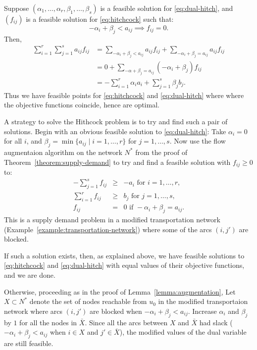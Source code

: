 \documentclass{amsbook}
\theoremstyle{definition}
\theoremstyle{remark}
\begin{document}
Suppose $(\alpha_1,\dotsc,\alpha_r,\beta_1,\dotsc,\beta_s)$ is a feasible solution for \eqref{eq:dual-hitch}, and $(f_{ij})$ is a feasible solution for \eqref{eq:hitchcock} such that:
\begin{equation}
  \label{eq:tight}
  -\alpha_i + \beta_j < a_{ij} \implies f_{ij}=0.
\end{equation}
Then,
\begin{align*}
  \sum_{i=1}^r \sum_{j=1}^s a_{ij}f_{ij} & = \sum_{-\alpha_i+\beta_j<a_{ij}} a_{ij}f_{ij} + \sum_{-\alpha_i+\beta_j=a_{ij}} a_{ij}f_{ij}\\
                                         & = 0 + \sum_{-\alpha+\beta_j=a_{ij}} (-\alpha_i+\beta_j)f_{ij}\\
  & = -\sum_{i=1}^r \alpha_i a_i + \sum_{j=1}^s \beta_jb_j.
\end{align*}
Thus we have feasible points for \eqref{eq:hitchcock} and \eqref{eq:dual-hitch} where where the objective functions coincide, hence are optimal.

A strategy to solve the Hithcock problem is to try and find such a pair of solutions.
Begin with an obvious feasible solution to \eqref{eq:dual-hitch}: Take $\alpha_i=0$ for all $i$, and $\beta_j = \min\{a_{ij}\mid i=1,\dotsc,r\}$ for $j=1,\dotsc,s$.
Now use the flow augmentaion algorithm on the network $N^*$  from the proof of Theorem~\ref{theorem:supply-demand} to try and find a feasible solution with $f_{ij}\geq 0$ to:
\begin{equation}
  \label{eq:2}
  \begin{array}{rcl}
    -\sum_{j=1}^s f_{ij} & \geq & - a_i \text{ for }i=1,\dotsc,r,\\
    \sum_{i=1}^r f_{ij} & \geq & b_j \text{ for }j=1,\dotsc,s,\\
    f_{ij} & = & 0 \text{ if } -\alpha_i+\beta_j = a_{ij}.
  \end{array}
\end{equation}
This is a supply demand problem in a modified transportation network (Example~\ref{example:transportation-network}) where some of the arcs $(i,j')$ are blocked.

If such a solution exists, then, as explained above, we have feasible solutions to \eqref{eq:hitchcock} and \eqref{eq:dual-hitch} with equal values of their objective functions, and we are done.

Otherwise, proceeding as in the proof of Lemma~\ref{lemma:augmentation}, Let $X\subset N^*$ denote the set of nodes reachable from $u_0$ in the modified transportaion network where arcs $(i,j')$ are blocked when $-\alpha_i+\beta_j<a_{ij}$.
Increase $\alpha_i$ and $\beta_j$ by $1$ for all the nodes in $\bar X$.
Since all the arcs between $X$ and $\bar X$ had slack ($-\alpha_i+\beta_j<a_{ij}$ when $i\in X$ and $j'\in \bar X$), the modified values of the dual variable are still feasible.
\end{document}
